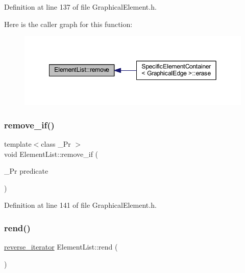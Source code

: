 Definition at line 137 of file Graphical\+Element.\+h.

Here is the caller graph for this function\+:
\nopagebreak
\begin{figure}[H]
\begin{center}
\leavevmode
\includegraphics[width=349pt]{class_element_list_a06b71e09b7ca85b416effbdac076ec49_icgraph}
\end{center}
\end{figure}
\mbox{\label{class_element_list_aa851e6d5b10920f2541d3dc0f5f2ee57}} 
\subsubsection{\texorpdfstring{remove\+\_\+if()}{remove\_if()}}
{\footnotesize\ttfamily template$<$class \+\_\+\+Pr $>$ \\
void Element\+List\+::remove\+\_\+if (\begin{DoxyParamCaption}\item[{\+\_\+\+Pr}]{predicate }\end{DoxyParamCaption})\hspace{0.3cm}{\ttfamily [inline]}}



Definition at line 141 of file Graphical\+Element.\+h.

\mbox{\label{class_element_list_a5c77af44a070ae80cddef7ce161e2f8b}} 
\subsubsection{\texorpdfstring{rend()}{rend()}}
{\footnotesize\ttfamily \hyperlink{class_element_list_a5a94d1e25a0deeb3f222dc12fa115174}{reverse\+\_\+iterator} Element\+List\+::rend (\begin{DoxyParamCaption}{ }\end{DoxyParamCaption})\hspace{0.3cm}{\ttfamily [inline]}}



